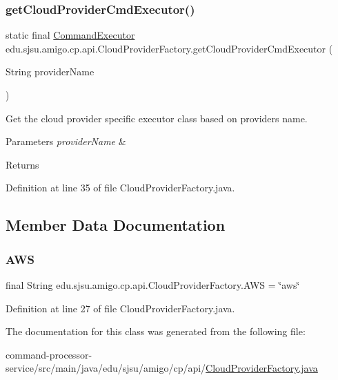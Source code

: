 \subsubsection{\texorpdfstring{get\+Cloud\+Provider\+Cmd\+Executor()}{getCloudProviderCmdExecutor()}}
{\footnotesize\ttfamily static final \hyperlink{interfaceedu_1_1sjsu_1_1amigo_1_1cp_1_1api_1_1_command_executor}{Command\+Executor} edu.\+sjsu.\+amigo.\+cp.\+api.\+Cloud\+Provider\+Factory.\+get\+Cloud\+Provider\+Cmd\+Executor (\begin{DoxyParamCaption}\item[{String}]{provider\+Name }\end{DoxyParamCaption})\hspace{0.3cm}{\ttfamily [static]}}

Get the cloud provider specific executor class based on provider\textquotesingle{}s name.


\begin{DoxyParams}{Parameters}
{\em provider\+Name} & \\
\hline
\end{DoxyParams}
\begin{DoxyReturn}{Returns}

\end{DoxyReturn}


Definition at line 35 of file Cloud\+Provider\+Factory.\+java.



\subsection{Member Data Documentation}
\mbox{\label{classedu_1_1sjsu_1_1amigo_1_1cp_1_1api_1_1_cloud_provider_factory_a6204ce8b947a782003efaeeb40ac68f1}} 
\subsubsection{\texorpdfstring{A\+WS}{AWS}}
{\footnotesize\ttfamily final String edu.\+sjsu.\+amigo.\+cp.\+api.\+Cloud\+Provider\+Factory.\+A\+WS = \char`\"{}aws\char`\"{}\hspace{0.3cm}{\ttfamily [static]}}



Definition at line 27 of file Cloud\+Provider\+Factory.\+java.



The documentation for this class was generated from the following file\+:\begin{DoxyCompactItemize}
\item 
command-\/processor-\/service/src/main/java/edu/sjsu/amigo/cp/api/\hyperlink{_cloud_provider_factory_8java}{Cloud\+Provider\+Factory.\+java}\end{DoxyCompactItemize}
